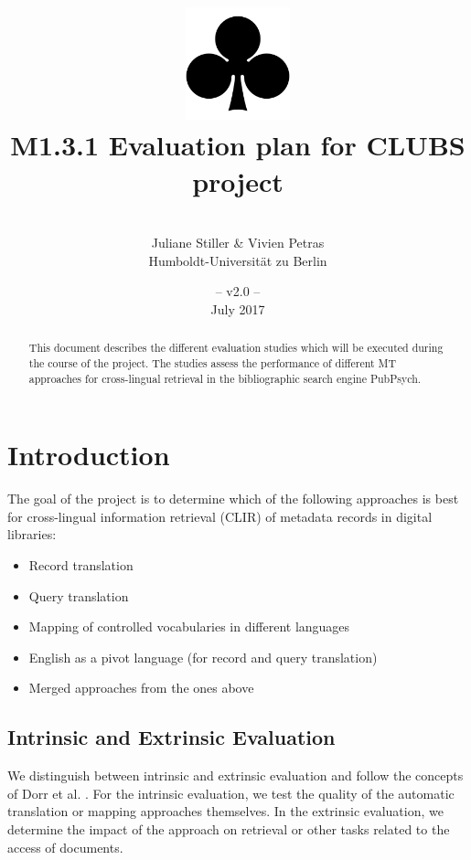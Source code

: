 \documentclass[a4paper,11pt]{article}
\title{
\includegraphics[width=3cm]{./img/200px-SuitClubs.png} \\
\Huge M1.3.1 Evaluation plan for CLUBS project \\ 
}
\author{\vspace*{1cm}\\ \LARGE Juliane Stiller \& Vivien Petras \medskip \\ \Large Humboldt-Universit\"at zu Berlin}
\date{\vspace*{2cm} -- v2.0 --\\July 2017}
\begin{document}
\clearpage\maketitle
\thispagestyle{empty}

\vspace*{5cm}
\begin{abstract}
This document describes the different evaluation studies which will be executed during the course of the project. The studies assess the performance of different MT approaches for cross-lingual retrieval in the bibliographic search engine PubPsych.
\end{abstract}

\newpage
\tableofcontents
\clearpage


\section{Introduction}
\label{s:intro}

The goal of the project is to determine which of the following approaches is best for cross-lingual information retrieval (CLIR) of metadata records in digital libraries:
\begin{itemize}
\item Record translation
\item Query translation
\item Mapping of controlled vocabularies in different languages
\item English as a pivot language (for record and query translation)
\item Merged approaches from the ones above
\end{itemize}

\subsection{Intrinsic and Extrinsic Evaluation}
We distinguish between intrinsic and extrinsic evaluation and follow the concepts of Dorr et al. \cite{dorr_machine_2011}. For the intrinsic evaluation, we test the quality of the automatic translation or mapping approaches themselves. In the extrinsic evaluation, we determine the impact of the approach on retrieval or other tasks related to the access of documents.
\end{document}

